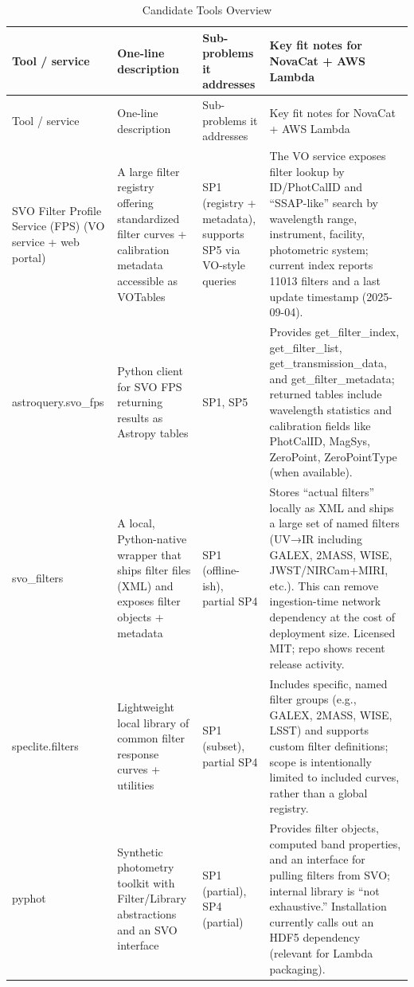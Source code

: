 \documentclass[twocolumn]{aastex701}
\begin{document}
\begin{longtable}{p{3cm} p{3cm} p{3cm} p{5cm}}
\caption{Candidate Tools Overview}\\
\hline
Tool / service & One-line description & Sub-problems it addresses & Key fit notes for NovaCat + AWS Lambda \\
\hline
\endfirsthead

\hline
Tool / service & One-line description & Sub-problems it addresses & Key fit notes for NovaCat + AWS Lambda \\
\hline
\endhead

SVO Filter Profile Service (FPS) (VO service + web portal) &
A large filter registry offering standardized filter curves + calibration metadata accessible as VOTables &
SP1 (registry + metadata), supports SP5 via VO-style queries &
The VO service exposes filter lookup by ID/PhotCalID and “SSAP-like” search by wavelength range, instrument, facility, photometric system; current index reports 11013 filters and a last update timestamp (2025-09-04). \citep{ref2} \\

astroquery.svo\_fps &
Python client for SVO FPS returning results as Astropy tables &
SP1, SP5 &
Provides get\_filter\_index, get\_filter\_list, get\_transmission\_data, and get\_filter\_metadata; returned tables include wavelength statistics and calibration fields like PhotCalID, MagSys, ZeroPoint, ZeroPointType (when available). \citep{ref3} \\

svo\_filters &
A local, Python-native wrapper that ships filter files (XML) and exposes filter objects + metadata &
SP1 (offline-ish), partial SP4 &
Stores “actual filters” locally as XML and ships a large set of named filters (UV→IR including GALEX, 2MASS, WISE, JWST/NIRCam+MIRI, etc.). This can remove ingestion-time network dependency at the cost of deployment size. Licensed MIT; repo shows recent release activity. \citep{ref4} \\

speclite.filters &
Lightweight local library of common filter response curves + utilities &
SP1 (subset), partial SP4 &
Includes specific, named filter groups (e.g., GALEX, 2MASS, WISE, LSST) and supports custom filter definitions; scope is intentionally limited to included curves, rather than a global registry. \citep{ref5} \\

pyphot &
Synthetic photometry toolkit with Filter/Library abstractions and an SVO interface &
SP1 (partial), SP4 (partial) &
Provides filter objects, computed band properties, and an interface for pulling filters from SVO; internal library is “not exhaustive.” Installation currently calls out an HDF5 dependency (relevant for Lambda packaging). \citep{ref6} \\


\end{longtable}
\end{document}
